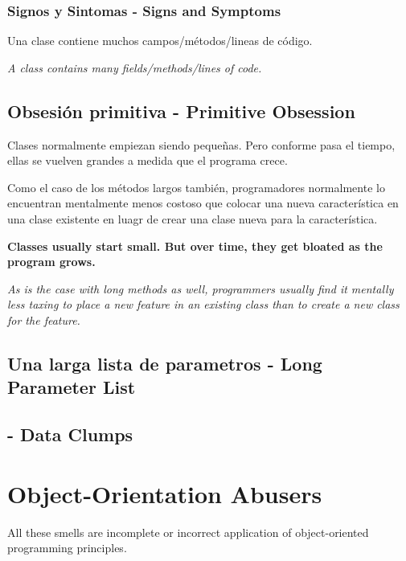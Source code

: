 \documentclass[11pt,a4paper,oneside]{book}
\begin{document}
\subsubsection{Signos y Sintomas - Signs and Symptoms}

Una clase contiene muchos campos/métodos/lineas de código.

\textit{A class contains many fields/methods/lines of code.}


    
\subsection{Obsesión primitiva -   Primitive Obsession}
Clases normalmente empiezan siendo pequeñas. Pero conforme pasa el tiempo, ellas se vuelven grandes a medida que el programa crece.

Como el caso de los métodos largos también, programadores normalmente lo encuentran mentalmente menos costoso que colocar una nueva característica en una clase existente en luagr de crear una clase nueva para la característica. 

\textbf{Classes usually start small. But over time, they get bloated as the program grows.}

\textit{As is the case with long methods as well, programmers usually find it mentally less taxing to place a new feature in an existing class than to create a new class for the feature.}

\subsection{Una larga lista de parametros -   Long Parameter List}

\subsection{ -   Data Clumps}

    
    
    
    
    



\section{Object-Orientation Abusers} 

All these smells are incomplete or incorrect application of object-oriented programming principles.
    \newline
    
\end{document}
